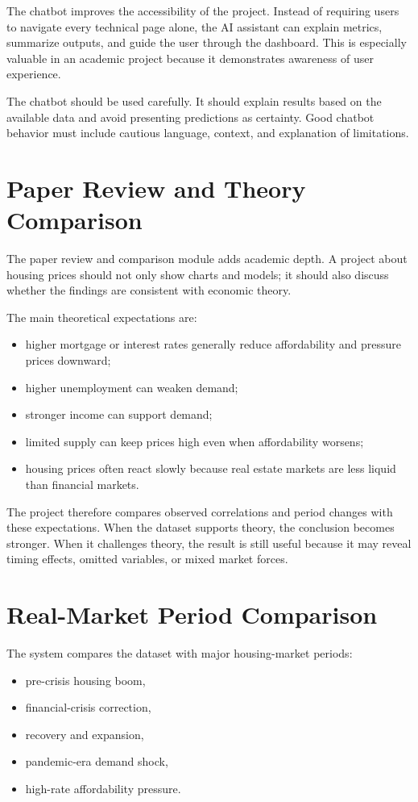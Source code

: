 The chatbot improves the accessibility of the project. Instead of requiring users to navigate every technical page alone, the AI assistant can explain metrics, summarize outputs, and guide the user through the dashboard. This is especially valuable in an academic project because it demonstrates awareness of user experience.

The chatbot should be used carefully. It should explain results based on the available data and avoid presenting predictions as certainty. Good chatbot behavior must include cautious language, context, and explanation of limitations.

\section{Paper Review and Theory Comparison}

The paper review and comparison module adds academic depth. A project about housing prices should not only show charts and models; it should also discuss whether the findings are consistent with economic theory.

The main theoretical expectations are:
\begin{itemize}
\item higher mortgage or interest rates generally reduce affordability and pressure prices downward;
\item higher unemployment can weaken demand;
\item stronger income can support demand;
\item limited supply can keep prices high even when affordability worsens;
\item housing prices often react slowly because real estate markets are less liquid than financial markets.
\end{itemize}

The project therefore compares observed correlations and period changes with these expectations. When the dataset supports theory, the conclusion becomes stronger. When it challenges theory, the result is still useful because it may reveal timing effects, omitted variables, or mixed market forces.

\section{Real-Market Period Comparison}

The system compares the dataset with major housing-market periods:
\begin{itemize}
\item pre-crisis housing boom,
\item financial-crisis correction,
\item recovery and expansion,
\item pandemic-era demand shock,
\item high-rate affordability pressure.
\end{itemize}


